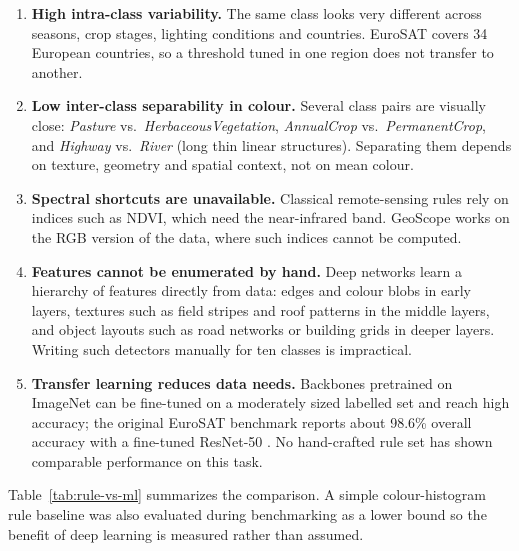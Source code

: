 \documentclass[11pt,a4paper]{article}
\begin{document}
\begin{enumerate}[nosep]
  \item \textbf{High intra-class variability.} The same class looks very different across seasons,
        crop stages, lighting conditions and countries. EuroSAT covers 34 European countries, so
        a threshold tuned in one region does not transfer to another.
  \item \textbf{Low inter-class separability in colour.} Several class pairs are visually close:
        \textit{Pasture} vs.\ \textit{HerbaceousVegetation}, \textit{AnnualCrop} vs.\
        \textit{PermanentCrop}, and \textit{Highway} vs.\ \textit{River} (long thin linear
        structures). Separating them depends on texture, geometry and spatial context, not on
        mean colour.
  \item \textbf{Spectral shortcuts are unavailable.} Classical remote-sensing rules rely on
        indices such as NDVI, which need the near-infrared band. GeoScope works on the RGB version
        of the data, where such indices cannot be computed.
  \item \textbf{Features cannot be enumerated by hand.} Deep networks learn a hierarchy of features
        directly from data: edges and colour blobs in early layers, textures such as field stripes
        and roof patterns in the middle layers, and object layouts such as road networks or
        building grids in deeper layers. Writing such detectors manually for ten classes is
        impractical.
  \item \textbf{Transfer learning reduces data needs.} Backbones pretrained on ImageNet can be
        fine-tuned on a moderately sized labelled set and reach high accuracy; the original EuroSAT
        benchmark reports about 98.6\% overall accuracy with a fine-tuned ResNet-50 \cite{helber2019}.
        No hand-crafted rule set has shown comparable performance on this task.
\end{enumerate}

Table~\ref{tab:rule-vs-ml} summarizes the comparison. A simple colour-histogram rule baseline
was also evaluated during benchmarking as a lower bound so the benefit of deep learning is measured
rather than assumed.
\end{document}
